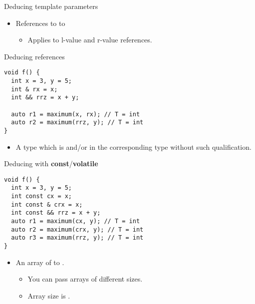 \begin{frame}{Deducing template parameters}

\begin{itemize}
  \item References to   to 
    \begin{itemize}
      \item Applies to l-value and r-value references.
    \end{itemize}
\end{itemize}

\begin{block}{Deducing references}
\begin{lstlisting}
void f() {
  int x = 3, y = 5;
  int & rx = x;
  int && rrz = x + y;

  auto r1 = maximum(x, rx); // T = int
  auto r2 = maximum(rrz, y); // T = int
}
\end{lstlisting}
\end{block}

\framebreak

\begin{itemize}
  \item A type  which is  and/or 
         in the corresponding type without such qualification.
\end{itemize}

\begin{block}{Deducing with \textbf{const}/\textbf{volatile}}
\begin{lstlisting}
void f() {
  int x = 3, y = 5;
  int const cx = x;
  int const & crx = x;
  int const && rrz = x + y;
  auto r1 = maximum(cx, y); // T = int
  auto r2 = maximum(crx, y); // T = int
  auto r3 = maximum(rrz, y); // T = int
}
\end{lstlisting}
\end{block}

\framebreak

\begin{itemize}
  \item An array of   to .
    \begin{itemize}
      \item You can pass arrays of different sizes.
      \item Array size is .
    \end{itemize}
\end{itemize}


\end{frame}
